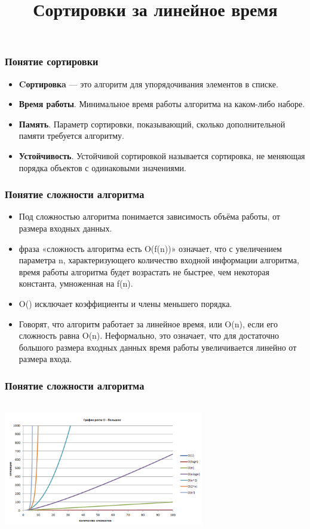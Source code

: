 \documentclass[t]{beamer}  %
\title{Сортировки за линейное время}
\begin{document}
	
	\frame[plain]{\titlepage}	%
	
	
\begin{frame}[t]
	\frametitle{Понятие сортировки}
		\begin{itemize}
	\item \textbf{Cортировкa} — это алгоритм для упорядочивания элементов в списке. \pause
		\item \textbf{Время работы}. Минимальное время работы алгоритма на каком-либо наборе. \pause
		\item  \textbf{Память}. 
		Параметр сортировки, показывающий, сколько дополнительной памяти требуется алгоритму.
        \pause
        \item  \textbf{Устойчивость}. 
        Устойчивой сортировкой называется сортировка, не меняющая порядка объектов с одинаковыми значениями.
		\end{itemize}
\end{frame}

\begin{frame}[t]
	\frametitle{Понятие сложности алгоритма}
		\begin{itemize}
			\pause
        	\item	Под сложностью алгоритма понимается зависимость объёма работы, от размера входных данных.\pause
        	\item фраза «сложность алгоритма есть O(f(n))» означает, что с увеличением параметра n, характеризующего количество входной информации алгоритма, время работы алгоритма будет возрастать не быстрее, чем некоторая константа, умноженная на f(n).\pause
        	\item O() исключает коэффициенты и члены меньшего порядка.\pause
        	\item Говорят, что алгоритм работает за линейное время, или O(n), если его сложность равна O(n). Неформально, это означает, что для достаточно большого размера входных данных время работы увеличивается линейно от размера входа. 
    	\end{itemize}
\end{frame}

\begin{frame}[t]
	\frametitle{Понятие сложности алгоритма}

	\includegraphics[width=330px,height=220px]{graph1.png}

\end{frame}
\end{document}
